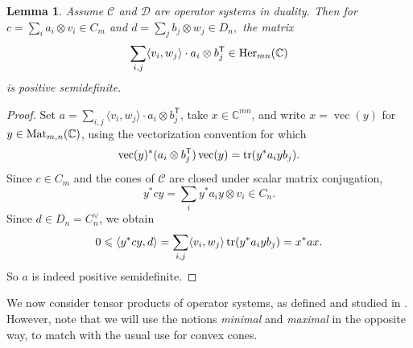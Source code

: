 \documentclass[11pt,onecolumn]{article}
\theoremstyle{plain}
\newtheorem{lemma}[lemma]{Lemma}
\theoremstyle{definition}
\begin{document}
\begin{lemma}
\label{lem:psd}
    Assume $\mathcal C$ and $\mathcal D$ are operator systems in duality. Then for $c=\sum_i a_i\otimes v_i\in C_m$ and $d=\sum_j b_j\otimes w_j\in D_n,$ the matrix
    \[
      \sum_{i,j} \langle v_i,w_j\rangle\cdot a_i\otimes b_j^{\mathsf T}
      \in {\rm Her}_{mn}(\mathbb C)
    \]
    is positive semidefinite.
\end{lemma}
\begin{proof}
    Set $a=\sum_{i,j} \langle v_i,w_j\rangle\cdot
    a_i\otimes b_j^{\mathsf T}$, take $x\in\mathbb C^{mn}$, and write
    $x=\operatorname{vec}(y)$ for $y\in {\rm Mat}_{m,n}(\mathbb C)$, using
    the vectorization convention for which
    \[
        \operatorname{vec}(y)^*(a_i\otimes b_j^{\mathsf T})
        \operatorname{vec}(y)={\rm tr}(y^*a_iyb_j).
    \]
    Since $c\in C_m$ and the cones of
    $\mathcal C$ are closed under scalar matrix conjugation,
    \[
        y^*cy=\sum_i y^*a_iy\otimes v_i\in C_n.
    \]
    Since $d\in D_n=C_n^\vee$, we obtain
    \[
        0\leqslant \langle y^*cy,d\rangle
        =\sum_{i,j}\langle v_i,w_j\rangle\,
          {\rm tr}(y^*a_iyb_j)=x^*ax.
    \]
    So $a$ is indeed positive semidefinite.
\end{proof}


We now consider tensor products of operator systems, as defined and studied in \cite{KavrukPaulsenTodorovTomforde2011}. However, note that we will use the notions \emph{minimal} and \emph{maximal} in the opposite way, to match with the usual use for convex cones. 
\end{document}
